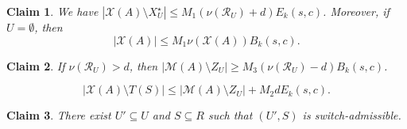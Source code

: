\documentclass[10pt,a4paper]{amsart}
\newtheorem{claim}{Claim}
\newcommand{\M}{\mathcal M}
\newcommand{\Rcal}{\mathcal R}
\newcommand{\X}{\mathcal X}
\begin{document}
\begin{claim}\label{cl:defect-capture}
        We have $|\X(A)\setminus X_U^\star|\le M_1(\nu(\Rcal_U)+d)E_k(s,c)$.
        Moreover, if $U=\emptyset$, then
        \[
                |\X(A)|\le M_1\nu(\X(A))B_k(s,c).
        \]
\end{claim}

\begin{claim}\label{cl:defect-completion}
        If $\nu(\Rcal_U)>d$, then $|\M(A)\setminus Z_U|\ge M_3(\nu(\Rcal_U)-d)B_k(s,c)$.
\end{claim}

\begin{equation}\label{eq:defect-switch-admissible}
        |\X(A)\setminus T(S)|
        \le
        |\M(A)\setminus Z_U|+M_2dE_k(s,c).
\end{equation}

\begin{claim}\label{cl:defect-switch-admissible-exists}
        There exist $U'\subseteq U$ and
        $S\subseteq R$ such that $(U',S)$ is switch-admissible.
\end{claim}
\end{document}

